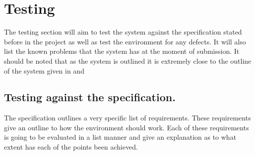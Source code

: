 \chapter{Testing}
	The testing section will aim to test the system against the specification stated before in the project as well as test the environment for any defects. It will also list the known problems that the system has at the moment of submission. It should be noted that as the system is outlined it is extremely close to the outline of the system given in \cite{Elizabeth} and \cite{technical}

    \section{Testing against the specification.}
      The specification outlines a very specific list of requirements. These requirements give an outline to how the environment should work. Each of these requirements is going to be evaluated in a list manner and give an explanation as to what extent has each of the points been achieved.
